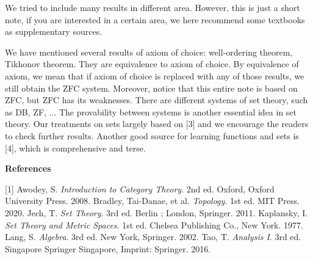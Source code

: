 \documentclass[10pt]{article}
\begin{document}
We tried to include many results in different area. However, this is just a short note, if you are interested in a certain area, we here recommend some textbooks as supplementary sources.
\par
We have mentioned several results of axiom of choice: well-ordering theorem, Tikhonov theorem. They are equivalence to axiom of choice. By equivalence of axiom, we mean that if axiom of choice is replaced with any of those results, we still obtain the ZFC system. Moreover, notice that this entire note is based on ZFC, but ZFC has its weaknesses. There are different systems of set theory, such as DB, ZF, $\dots$ The provability between systems is another essential idea in set theory. Our treatments on sets largely based on [3] and we encourage the readers to check further results. Another good source for learning functions and sets is [4], which is comprehensive and terse. 


\vspace{\baselineskip}
\begin{center}
    \large\bfseries References\normalsize
\end{center}
[1] Awodey, S. \textit{Introduction to Category Theory}. 2nd ed. Oxford, Oxford University Press. 2008.
\newline
[2] Bradley, Tai-Danae, et al. \textit{Topology}. 1st ed. MIT Press. 2020.
\newline
[3] Jech, T. \textit{Set Theory}. 3rd ed. Berlin ; London, Springer. 2011.
\newline
[4] Kaplansky, I. \textit{Set Theory and Metric Spaces}. 1st ed. Chelsea Publishing Co., New York. 1977.
\newline
[5] Lang, S. \textit{Algebra}. 3rd ed. New York, Springer. 2002.
\newline
[6] Tao, T. \textit{Analysis I}. 3rd ed. Singapore Springer Singapore, Imprint: Springer. 2016.
\hindex 
\end{document}
